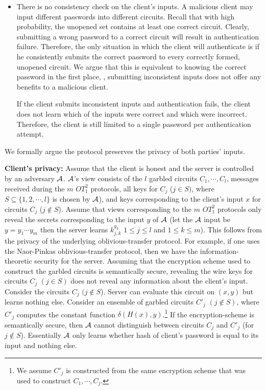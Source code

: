 \begin{itemize}
\item
There is no consistency check on the client's inputs.  A malicious client
may input different passwords into different circuits.  Recall that with
high probability, the unopened set contains at least one correct circuit.
Clearly, submitting a wrong password to a correct circuit will result
in authentication failure.  Therefore, the only situation in which
the client will authenticate is if he consistently submits the correct
password to every correctly formed, unopened circuit.  We argue that
this is equivalent to knowing the correct password in the first place,
\ie, submitting inconsistent inputs does not offer any benefits to a
malicious client.

If the client submits inconsistent inputs and authentication fails,
the client does not learn which of the inputs were correct and which
were incorrect.  Therefore, the client is still limited to a single
password per authentication attempt.

\end{itemize}

We formally argue the protocol preserves the privacy of both parties'
inputs.

\noindent
{\bf Client's privacy:} Assume that the client is honest and the
server is controlled by an adversary ${\cal A}$.  ${\cal A}$'s view
consists of the $l$ garbled circuits $C_1,\cdots,C_l$, messages
received during the $m$ $OT_1^2$ protocols, all keys for $C_j$ ($j \in
S )$, where $S \subseteq \{ 1,2, \cdots, l \}$ is chosen by ${\cal
A}$), and keys corresponding to the client's input $x$ for circuits
$C_j$ ($j \not\in S$). Assume that views corresponding to the $m$
$OT_1^2$ protocols only reveal the secrets corresponding to the input
$y$ of ${\cal A}$ (let the ${\cal A}$ input be $y = y_1 \cdots y_m$
then the server learns $k^{y_k}_{j,k}$ $1 \leq j \leq l$ and $1 \leq k
\leq m$). This follows from the privacy of the underlying
oblivious-transfer protocol. For example, if one uses the Naor-Pinkas
oblivious-transfer protocol, then we have the information-theoretic security
for the server. Assuming that the encryption scheme used
to construct the garbled circuits is semantically secure, revealing
the wire keys for circuits $C_j$ $(j \in S)$ does not reveal any
information about the client's input. Consider the circuits $C_j$ $(j
\not\in S$). Server can evaluate this circuit on $(x,y)$ but learns
nothing else. Consider an ensemble of garbled circuits $C'_j$ $(j
\not\in S)$, 
where $C'_j$ computes the constant function $\delta (H(x),y)$.\footnote{ We assume $C'_j$ is constructed from the same
encryption scheme that was used to construct $C_1,\cdots,C_j$.} If
the encryption-scheme is semantically secure, then ${\cal A}$ cannot
distinguish between circuits $C_j$ and $C'_j$ (for $j \not\in
S$). Essentially ${\cal A}$ only learns whether hash of client's
password is equal to its input and nothing else.

